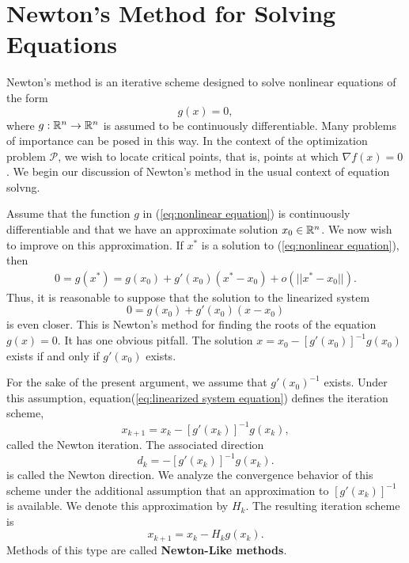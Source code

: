 \section{Newton's Method for Solving Equations}
Newton's method is an iterative scheme
designed to solve nonlinear equations of the form
\begin{equation}
    g(x)=0,
    \label{eq:nonlinear equation}
\end{equation}
where $g:\mathbb{R}^n\rightarrow \mathbb{R}^n$ is assumed to be continuously differentiable. Many problems of importance can be posed in this way. In the context of the optimization problem $\mathcal{P}$, we wish 
to locate  critical points, that is, points at which $\nabla f(x)=0$. We begin our discussion of
Newton’s method in the usual context of equation solvng. 
\par 
Assume that the function $g$ in (\ref{eq:nonlinear equation}) is continuously differentiable and that we have an
approximate solution $x_0\in\mathbb{R}^n$. We now wish to improve on this approximation. If $x^*$ is a solution to (\ref{eq:nonlinear equation}), then
\begin{align*}
    0= g(x^*)=g(x_0)+g'(x_0)(x^*-x_0)+o(||x^*-x_0||).
\end{align*}
Thus, it is reasonable to suppose that the solution to the linearized
system
\begin{equation}
    0=g(x_0)+g'(x_0)(x-x_0)
    \label{eq:linearized system equation}
\end{equation}
is even closer. This is Newton’s method for finding the roots of the equation $g(x)=0$.  It
has one obvious pitfall. The solution $x=x_0- [g'(x_0)]^{-1}g(x_0)$ exists if and only if $g'(x_0)$ exists. 
\par 
For the sake of the present argument, we assume that $g'(x_0)^{-1}$ exists. Under this assumption, equation(\ref{eq:linearized system equation})  defines the iteration scheme,
\begin{equation}
    x_{k+1} = x_k - [g'(x_k)]^{-1}g(x_k), 
\end{equation}
called the Newton iteration. The associated direction
\begin{equation}
    d_k = - [g'(x_k)]^{-1}g(x_k).
\end{equation}
is called the Newton direction. We analyze the convergence behavior of this scheme under
the additional assumption that an approximation to $[g'(x_k)]^{-1}$ is available. We denote
this approximation by $H_k$. The resulting iteration scheme is 
\begin{equation}
    x_{k+1} = x_k -H_kg(x_k). 
\end{equation}
Methods of this type are called \textbf{Newton-Like methods}.
